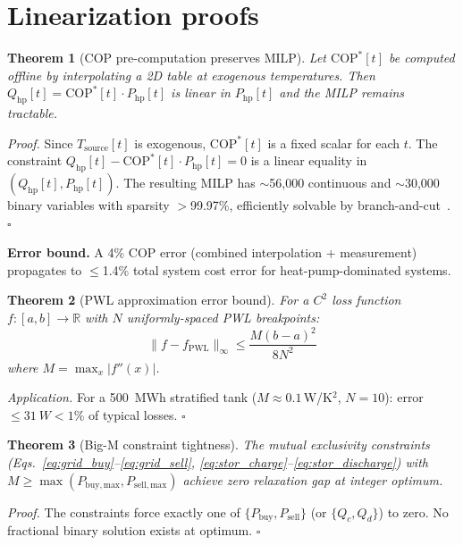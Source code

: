 \documentclass[a4paper,fleqn]{cas-dc}
\newtheorem{theorem}{Theorem}
\begin{document}
\section{Linearization proofs}\label{app:proofs}

\begin{theorem}[COP pre-computation preserves MILP]\label{thm:cop}
Let $\mathrm{COP}^*[t]$ be computed offline by interpolating a 2D table at exogenous temperatures. Then $Q_\mathrm{hp}[t] = \mathrm{COP}^*[t] \cdot P_\mathrm{hp}[t]$ is linear in $P_\mathrm{hp}[t]$ and the MILP remains tractable.
\end{theorem}

\noindent\textit{Proof.} Since $T_\mathrm{source}[t]$ is exogenous, $\mathrm{COP}^*[t]$ is a fixed scalar for each $t$. The constraint $Q_\mathrm{hp}[t] - \mathrm{COP}^*[t] \cdot P_\mathrm{hp}[t] = 0$ is a linear equality in $(Q_\mathrm{hp}[t], P_\mathrm{hp}[t])$. The resulting MILP has $\sim$56,000 continuous and $\sim$30,000 binary variables with sparsity $>$99.97\%, efficiently solvable by branch-and-cut~\citep{Wolsey1998}. \hfill$\square$

\textbf{Error bound.} A 4\% COP error (combined interpolation + measurement) propagates to $\leq$1.4\% total system cost error for heat-pump-dominated systems.

\begin{theorem}[PWL approximation error bound]\label{thm:pwl}
For a $C^2$ loss function $f: [a,b] \to \mathbb{R}$ with $N$ uniformly-spaced PWL breakpoints:
\begin{equation}
\|f - f_\mathrm{PWL}\|_\infty \leq \frac{M(b-a)^2}{8N^2}
\end{equation}
where $M = \max_{x} |f''(x)|$.
\end{theorem}

\noindent\textit{Application.} For a \SI{500}{MWh} stratified tank ($M \approx 0.1$\,W/K$^2$, $N=10$): error $\leq \SI{31}{W} < 1$\% of typical losses. \hfill$\square$

\begin{theorem}[Big-M constraint tightness]\label{thm:bigm}
The mutual exclusivity constraints (Eqs.~\ref{eq:grid_buy}--\ref{eq:grid_sell}, \ref{eq:stor_charge}--\ref{eq:stor_discharge}) with $M \geq \max(P_\mathrm{buy,max}, P_\mathrm{sell,max})$ achieve zero relaxation gap at integer optimum.
\end{theorem}

\noindent\textit{Proof.} The constraints force exactly one of $\{P_\mathrm{buy}, P_\mathrm{sell}\}$ (or $\{Q_c, Q_d\}$) to zero. No fractional binary solution exists at optimum. \hfill$\square$




\end{document}

